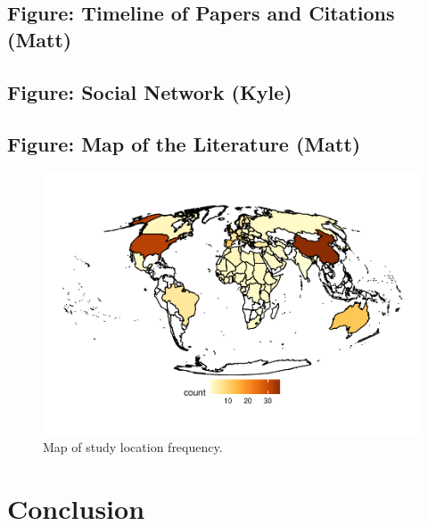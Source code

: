 \documentclass[12pt]{article}
\begin{document}
\hypertarget{figure-timeline-of-papers-and-citations-matt}{%
\subsection{Figure: Timeline of Papers and Citations
(Matt)}\label{figure-timeline-of-papers-and-citations-matt}}

\hypertarget{figure-social-network-kyle}{%
\subsection{Figure: Social Network
(Kyle)}\label{figure-social-network-kyle}}

\hypertarget{figure-map-of-the-literature-matt}{%
\subsection{Figure: Map of the Literature
(Matt)}\label{figure-map-of-the-literature-matt}}

\begin{figure}
\centering
\includegraphics{MainDocument_files/figure-latex/mapandtimelines-1.pdf}
\caption{Map of study location frequency. \label{fig-map}}
\end{figure}

\hypertarget{conclusion}{%
\section{Conclusion}\label{conclusion}}



\end{document}
